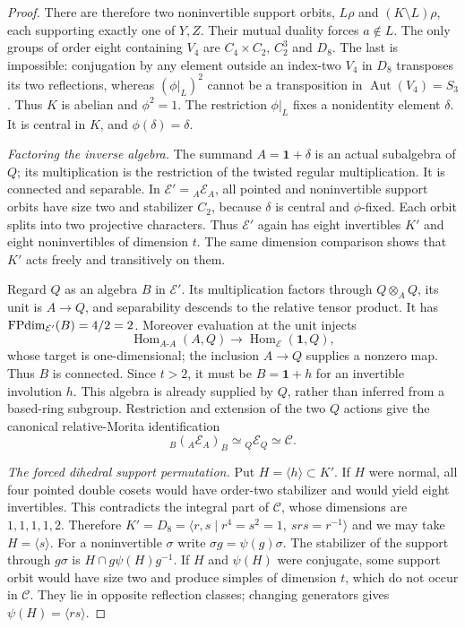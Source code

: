 \begin{proof}
There are therefore two noninvertible support orbits, $L\rho$ and
$(K\setminus L)\rho$, each supporting exactly one of $Y,Z$.
Their mutual duality forces $a\notin L$.  The only groups of order
eight containing $V_4$ are $C_4\times C_2$, $C_2^3$ and $D_8$.
The last is impossible: conjugation by any element outside an
index-two $V_4$ in $D_8$ transposes its two reflections, whereas
$(\phi|_L)^2$ cannot be a transposition in
$\operatorname{Aut}(V_4)=S_3$.  Thus $K$ is abelian and $\phi^2=1$.
The restriction $\phi|_L$ fixes a nonidentity element $\delta$.
It is central in $K$, and $\phi(\delta)=\delta$.

\medskip\noindent\emph{Factoring the inverse algebra.}
The summand $A=\mathbf1+\delta$ is an actual subalgebra of $Q$;
its multiplication is the restriction of the twisted regular
multiplication.  It is connected and separable.  In
$\mathcal E'={}_A\mathcal E_A$, all pointed and noninvertible
support orbits have size two and stabilizer $C_2$, because $\delta$
is central and $\phi$-fixed.  Each orbit splits into two projective
characters.  Thus $\mathcal E'$ again has eight invertibles $K'$
and eight noninvertibles of dimension $t$.  The same dimension
comparison shows that $K'$ acts freely and transitively on them.

Regard $Q$ as an algebra $B$ in $\mathcal E'$.  Its multiplication
factors through $Q\otimes_A Q$, its unit is $A\longrightarrow Q$,
and separability descends to the relative tensor product.  It has
$\operatorname{FPdim}_{\mathcal E'}(B)=4/2=2$.  Moreover evaluation at the unit
injects
\[
 \operatorname{Hom}_{A\text{-}A}(A,Q)
 \longrightarrow \operatorname{Hom}_{\mathcal E}(\mathbf1,Q),
\]
whose target is one-dimensional; the inclusion $A\to Q$ supplies
a nonzero map.  Thus $B$ is connected.  Since $t>2$, it must be
$B=\mathbf1+h$ for an invertible involution $h$.  This algebra is
already supplied by $Q$, rather than inferred from a based-ring
subgroup.  Restriction and extension of the two $Q$ actions give
the canonical relative-Morita identification
\[
 {}_B({}_A\mathcal E_A)_B\simeq{}_Q\mathcal E_Q\simeq\mathcal C.
\]

\medskip\noindent\emph{The forced dihedral support permutation.}
Put $H=\langle h\rangle\subset K'$.  If $H$ were normal, all four
pointed double cosets would have order-two stabilizer and would
yield eight invertibles.  This contradicts the integral part of
$\mathcal C$, whose dimensions are $1,1,1,1,2$.
Therefore $K'=D_8=\langle r,s\mid r^4=s^2=1,\ srs=r^{-1}\rangle$
and we may take $H=\langle s\rangle$.
For a noninvertible $\sigma$ write $\sigma g=\psi(g)\sigma$.
The stabilizer of the support through $g\sigma$ is
$H\cap g\psi(H)g^{-1}$.  If $H$ and $\psi(H)$ were conjugate,
some support orbit would have size two and produce simples of
dimension $t$, which do not occur in $\mathcal C$.
They lie in opposite reflection classes; changing generators gives
$\psi(H)=\langle rs\rangle$.


\end{proof}
